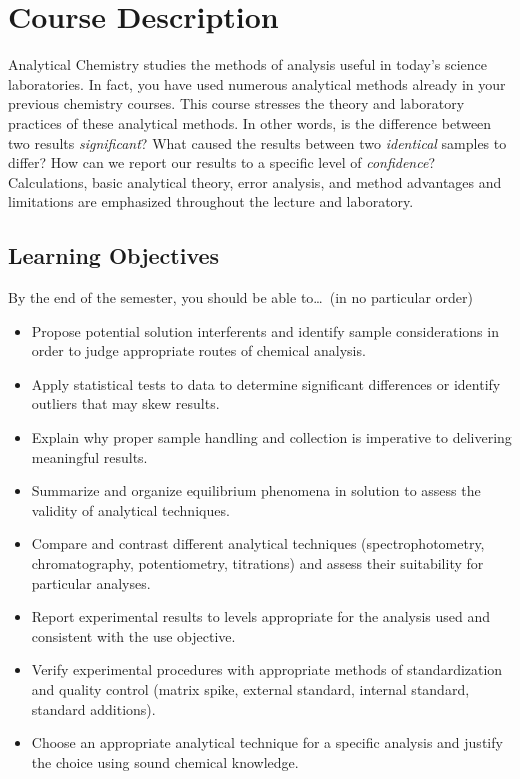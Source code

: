 \documentclass[11pt,letterpaper]{article}
\begin{document}
\section{Course Description}
Analytical Chemistry studies the methods of analysis useful in today's science
laboratories. In fact, you have used numerous analytical methods already in your
previous chemistry courses. This course stresses the theory and laboratory
practices of these analytical methods. In other words, is the difference between
two results \emph{significant}? What caused the results between two
\emph{identical} samples to differ? How can we report our results to a specific
level of \emph{confidence}? Calculations, basic analytical theory, error
analysis, and method advantages and limitations are emphasized throughout the
lecture and laboratory.

\subsection{Learning Objectives}
By the end
of the semester, you should be able to\ldots\ (in no particular order)
\begin{itemize}[noitemsep]
	\item Propose potential solution interferents and identify sample
		considerations in order to judge appropriate routes of chemical
		analysis.
	\item Apply statistical tests to data to determine significant
		differences or identify outliers that may skew results.
	\item Explain why proper sample handling and collection is imperative to
		delivering meaningful results.
	\item Summarize and organize equilibrium phenomena in solution to assess
		the validity of analytical techniques.
	\item Compare and contrast different analytical techniques
		(spectrophotometry, chromatography, potentiometry, titrations)
		and assess their suitability for particular analyses.
	\item Report experimental results to levels appropriate for the analysis
		used and consistent with the use objective.
	\item Verify experimental procedures with appropriate methods of
		standardization and quality control (matrix spike, external
		standard, internal standard, standard additions).
	\item Choose an appropriate analytical technique for a specific analysis
		and justify the choice using sound chemical knowledge.
\end{itemize}
\end{document}
